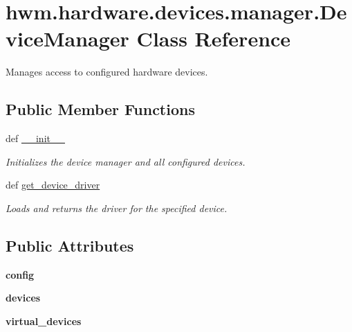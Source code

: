 \hypertarget{classhwm_1_1hardware_1_1devices_1_1manager_1_1_device_manager}{\section{hwm.\-hardware.\-devices.\-manager.\-Device\-Manager Class Reference}
\label{classhwm_1_1hardware_1_1devices_1_1manager_1_1_device_manager}
}


Manages access to configured hardware devices.  


\subsection*{Public Member Functions}
\begin{DoxyCompactItemize}
\item 
def \hyperlink{classhwm_1_1hardware_1_1devices_1_1manager_1_1_device_manager_af408311476cc209c4972718a45ec8eec}{\-\_\-\-\_\-init\-\_\-\-\_\-}
\begin{DoxyCompactList}\small\item\em Initializes the device manager and all configured devices. \end{DoxyCompactList}\item 
def \hyperlink{classhwm_1_1hardware_1_1devices_1_1manager_1_1_device_manager_a68bfae4ea3bc276193b239a5ba0722e7}{get\-\_\-device\-\_\-driver}
\begin{DoxyCompactList}\small\item\em Loads and returns the driver for the specified device. \end{DoxyCompactList}\end{DoxyCompactItemize}
\subsection*{Public Attributes}
\begin{DoxyCompactItemize}
\item 
\hypertarget{classhwm_1_1hardware_1_1devices_1_1manager_1_1_device_manager_adf1b81f8fc421b8d8d831e02c8e54f84}{{\bfseries config}}\label{classhwm_1_1hardware_1_1devices_1_1manager_1_1_device_manager_adf1b81f8fc421b8d8d831e02c8e54f84}

\item 
\hypertarget{classhwm_1_1hardware_1_1devices_1_1manager_1_1_device_manager_a60abf5df63166a029273134626ec0c6f}{{\bfseries devices}}\label{classhwm_1_1hardware_1_1devices_1_1manager_1_1_device_manager_a60abf5df63166a029273134626ec0c6f}

\item 
\hypertarget{classhwm_1_1hardware_1_1devices_1_1manager_1_1_device_manager_a4314a77e41ace202beaec08c84dbb593}{{\bfseries virtual\-\_\-devices}}\label{classhwm_1_1hardware_1_1devices_1_1manager_1_1_device_manager_a4314a77e41ace202beaec08c84dbb593}

\end{DoxyCompactItemize}
